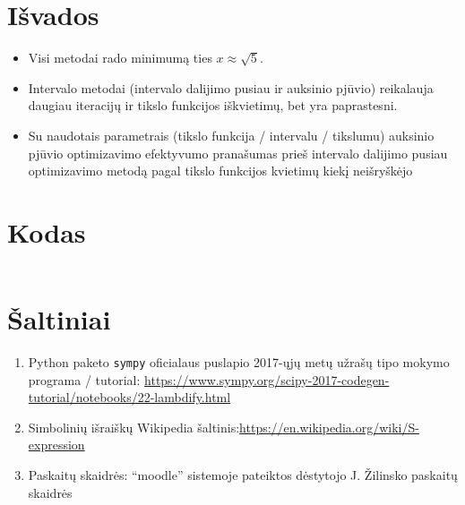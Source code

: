 \documentclass[lithuanian,a4paper,12pt]{article}
\begin{document}
\section{Išvados}
\begin{itemize}
    \item Visi metodai rado minimumą ties $x \approx \sqrt{5}$.
    \item Intervalo metodai (intervalo dalijimo pusiau ir auksinio pjūvio) reikalauja daugiau iteracijų ir tikslo funkcijos iškvietimų, bet yra paprastesni.
    \item Su naudotais parametrais (tikslo funkcija / intervalu / tikslumu) auksinio pjūvio optimizavimo efektyvumo pranašumas prieš intervalo dalijimo pusiau optimizavimo metodą pagal tikslo funkcijos kvietimų kiekį neišryškėjo
\end{itemize}

\section{Kodas}
\inputminted{python}{../code/main.py}

\section{Šaltiniai}
\begin{enumerate}
    \item Python paketo \texttt{sympy} oficialaus puslapio 2017-ųjų metų užrašų tipo mokymo programa / tutorial: \url{https://www.sympy.org/scipy-2017-codegen-tutorial/notebooks/22-lambdify.html}
    \item Simbolinių išraiškų Wikipedia šaltinis:\url{https://en.wikipedia.org/wiki/S-expression}
    \item Paskaitų skaidrės: ``moodle'' sistemoje pateiktos dėstytojo J. Žilinsko paskaitų skaidrės
\end{enumerate}
\end{document}
